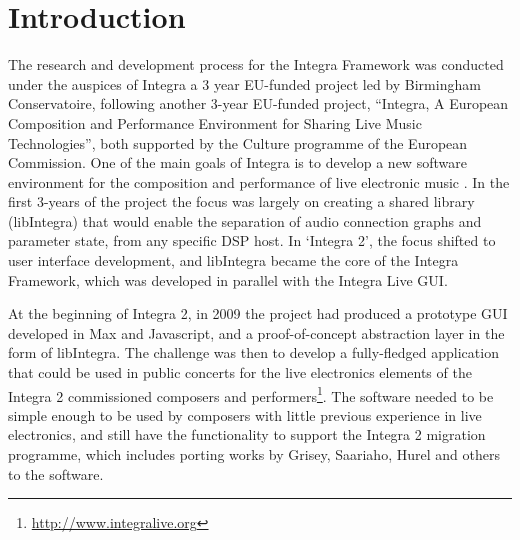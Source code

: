 \documentclass[twoside,10pt,a4paper]{article}
\title{\papertitle}
\begin{document}
    
\maketitle

\begin{abstract}
In this paper, we present the Integra Framework as a platform for the rapid and sustainable development of audio processing software. The framework provides a simple, robust API for managing graphs of connected modules, querying state and state saving as well as a dynamic OSC interface for real-time control. Additionally, the framework comes with extensive documentation and library of core modules for performing common tasks. This allows developers to create working, usable applications within days and to focus on research and development of novel user interfaces. As evidence of the framework's benefits, we present integra Live, a full-featured application for live electronics, developed in 9 months. 
\end{abstract}

\section{Introduction}\label{sec:introduction}


The research and development process for the Integra \linebreak Framework was conducted under the auspices of Integra a 3 year EU-funded project led by Birmingham Conservatoire, following another 3-year EU-funded project, ``Integra, A European Composition and Performance Environment for Sharing Live Music Technologies'', both supported by the Culture programme of the European Commission. One of the main goals of Integra is to develop a new software environment for the composition and performance of live electronic music \cite{Bullock:01}. In the first 3-years of the project the focus was largely on creating a shared library (libIntegra) that would enable the separation of audio connection graphs and parameter state, from any specific DSP host\cite{Bullock:02}. In `Integra 2', the focus shifted to user interface development, and libIntegra became the core of the Integra Framework, which was developed in parallel with the Integra Live GUI\cite{Bullock:01}.

At the beginning of Integra 2, in 2009 the project had produced a prototype GUI developed in Max and Java\-script\cite{Bullock:01}, and a proof-of-concept abstraction layer in the form of libIntegra. The challenge was then to develop a fully-fledged application that could be used in public concerts for the live electronics elements of the Integra 2 commissioned composers and performers\footnote{\href{http://www.integralive.org}{http://www.integralive.org}}. The software needed to be simple enough to be used by composers with little previous experience in live electronics, and still have the functionality to support the Integra 2 migration programme, which includes porting works by Grisey, Saariaho, Hurel and others to the software. 
\end{document}
